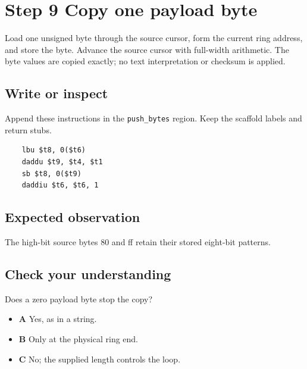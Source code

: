 \section{Step 9 Copy one payload byte}\label{ring-s09}

Load one unsigned byte through the source cursor, form the current ring address, and store the byte. Advance the source cursor with full-width arithmetic. The byte values are copied exactly; no text interpretation or checksum is applied.

\subsection{Write or inspect}
Append these instructions in the \texttt{push\_bytes} region. Keep the scaffold labels and return stubs.

\begin{verbatim}
    lbu $t8, 0($t6)
    daddu $t9, $t4, $t1
    sb $t8, 0($t9)
    daddiu $t6, $t6, 1
\end{verbatim}

\subsection{Expected observation}
The high-bit source bytes 80 and ff retain their stored eight-bit patterns.

\subsection{Check your understanding}
Does a zero payload byte stop the copy?

\begin{itemize}
  \item \textbf{A} Yes, as in a string.
  \item \textbf{B} Only at the physical ring end.
  \item \textbf{C} No; the supplied length controls the loop.
\end{itemize}
